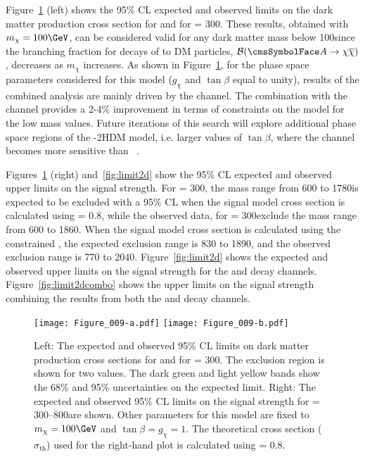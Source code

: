 Figure~\ref{fig:limitsexpected}  (left) shows the 95\% CL expected and observed limits on the dark matter production cross section for \Hbb and \HGG for \maz = 300\GeV. These results, obtained with $m_{\chi}= 100\GeV$, can be considered valid for any dark matter mass below 100\GeV since the branching fraction for decays of \Az to DM particles, ${\cal B}(\Az\rightarrow\chi\overline{\chi})$, decreases as $m_{\chi}$ increases.
As shown in Figure~\ref{fig:limitsexpected}, for the phase space parameters considered for this model ($g_{\chi}$ and $\tan{\beta}$ equal to unity), results of the combined analysis are mainly driven by the \Hbb channel. The combination with the \HGG channel provides a 2-4\% improvement in terms of constraints on the model for the low \PZpr mass values. Future iterations of this search will explore additional phase space regions of the \cPZpr-2HDM model, i.e. larger values of $\tan{\beta}$, where the \HGG channel becomes more sensitive than \Hbb~\cite{2HDM}.

Figures~\ref{fig:limitsexpected} (right) and~\ref{fig:limit2d} show the 95\% CL  expected and observed upper limits on the signal strength. 
For \maz = 300\GeV, the \PZpr mass range from 600 to 1780\GeV is expected to be excluded with a 95\% CL when the signal model 
cross section is calculated using \gzp = 0.8, while the 
observed data, for \maz = 300\GeV exclude the \zp mass range from 600 to 1860\GeV. 
When the signal model cross section is calculated using the constrained \gzp, the expected exclusion range is 830 to 1890\GeV, 
and the observed exclusion range is 770 to 2040\GeV. 
Figure~\ref{fig:limit2d} shows the expected and observed upper limits on the signal strength for the \Hbb and \HGG decay channels. 
Figure~\ref{fig:limit2dcombo} shows the upper limits on the signal strength combining the results from both the \Hbb and \HGG decay channels. 

\begin{figure}[htbp]
\centering
\texttt{[image: Figure\_009-a.pdf]}
\texttt{[image: Figure\_009-b.pdf]}
\caption{Left: The expected and observed 95\% CL limits 
on dark matter production cross sections for \Hbb and \HGG for \maz = 300\GeV. The exclusion region is shown for two 
\gzp values. The dark green and light yellow  bands show the 68\% and 95\% uncertainties on the expected limit.
Right: The expected and observed 95\% CL limits on the signal strength for \maz = 300--800\GeV are shown.
Other parameters for this model are fixed to $m_{\chi} = 100\GeV$ and $\tan{\beta} = g_{\chi} = 1$. 
The theoretical cross section ($\sigma_{\mathrm{th}}$) used for the right-hand plot is calculated using \gzp = 0.8.}
\label{fig:limitsexpected}
\end{figure}

